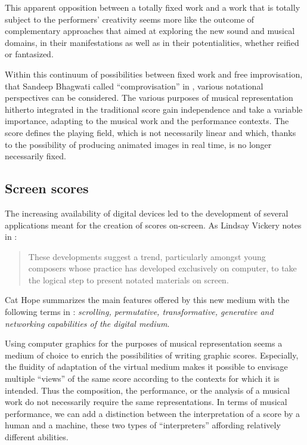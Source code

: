 This apparent opposition between a totally fixed work and a work that is totally subject to the performers' creativity seems more like the outcome of complementary approaches that aimed at exploring the new sound and musical domains, in their manifestations as well as in their potentialities, whether reified or fantasized.

Within this continuum of possibilities between fixed work and free improvisation, that Sandeep Bhagwati called “comprovisation” in \cite{bhagwati_notational_2013}, various notational perspectives can be considered. The various purposes of musical representation hitherto integrated in the traditional score gain independence and take a variable importance, adapting to the musical work and the performance contexts. The score defines the playing field, which is not necessarily linear and which, thanks to the possibility of producing animated images in real time, is no longer necessarily fixed.

\subsection{Screen scores}
The increasing availability of digital devices led to the development of several applications meant for the creation of scores on-screen. As Lindsay Vickery notes in \cite{vickery_limitations_2014} :

\begin{quotation}
These developments suggest a trend, particularly amongst young composers whose practice has developed exclusively on computer, to take the logical step to present notated materials on screen.
\end{quotation}

Cat Hope summarizes the main features offered by this new medium with the following terms in \cite{hope_screen_2011}: \textit{scrolling, permutative, transformative, generative and networking capabilities of the digital medium}.

Using computer graphics for the purposes of musical representation seems a medium of choice to enrich the possibilities of writing graphic scores. Especially, the fluidity of adaptation of the virtual medium makes it possible to envisage multiple “views” of the same score according to the contexts for which it is intended. Thus the composition, the performance, or the analysis of a musical work do not necessarily require the same representations. In terms of musical performance, we can add a distinction between the interpretation of a score by a human and a machine, these two types of “interpreters” affording relatively different abilities.

